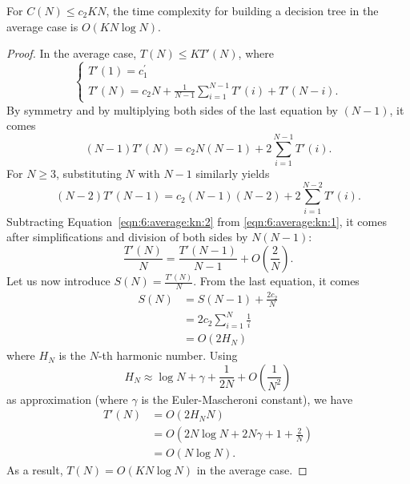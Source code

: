 \begin{theorem}\label{thm:6:average:kn}
For $C(N) \leq c_2 K N$, the time complexity for building a decision
tree in the average case is $O(K N \log N)$.
\end{theorem}

\begin{proof}
In the average case, $T(N) \leq K T'(N)$, where
\begin{equation}
\begin{cases}
T'(1) = c_1^\prime \\
T'(N) = c_2 N +  \frac{1}{N-1} \sum_{i=1}^{N-1} T'(i) + T'(N-i).
\end{cases}
\end{equation}
By symmetry and by multiplying both sides of the last equation by $(N-1)$, it comes
\begin{equation}\label{eqn:6:average:kn:1}
(N-1) T'(N) = c_2 N (N-1) +  2 \sum_{i=1}^{N-1} T'(i).
\end{equation}
For $N \geq 3$, substituting $N$ with $N-1$ similarly yields
\begin{equation}\label{eqn:6:average:kn:2}
(N-2) T'(N-1) = c_2 (N-1) (N-2) +  2 \sum_{i=1}^{N-2} T'(i).
\end{equation}
Subtracting Equation~\ref{eqn:6:average:kn:2} from \ref{eqn:6:average:kn:1},
it comes after simplifications and division of both sides by $N(N-1)$:
\begin{equation}
\frac{T'(N)}{N} = \frac{T'(N-1)}{N-1} + O(\frac{2}{N}).
\end{equation}
Let us now introduce $S(N) = \frac{T'(N)}{N}$. From the last equation, it comes
\begin{align}
S(N) &= S(N-1) + \frac{2 c_2}{N} \nonumber \\
     &= 2 c_2 \sum_{i=1}^N \frac{1}{i}  \nonumber \\
     &= O(2 H_N)
\end{align}
where $H_N$ is the $N$-th harmonic number. Using
\begin{equation}
H_N \approx \log N + \gamma + \frac{1}{2N} + O(\frac{1}{N^2})
\end{equation}
as approximation (where $\gamma$ is the Euler-Mascheroni constant), we have
\begin{align}
T'(N) &= O(2 H_N N) \nonumber \\
&= O(2 N \log N + 2 N\gamma + 1 + \frac{2}{N}) \nonumber \\
&= O(N \log N).
\end{align}
As a result, $T(N) = O(KN \log N)$ in the average case.
\end{proof}

